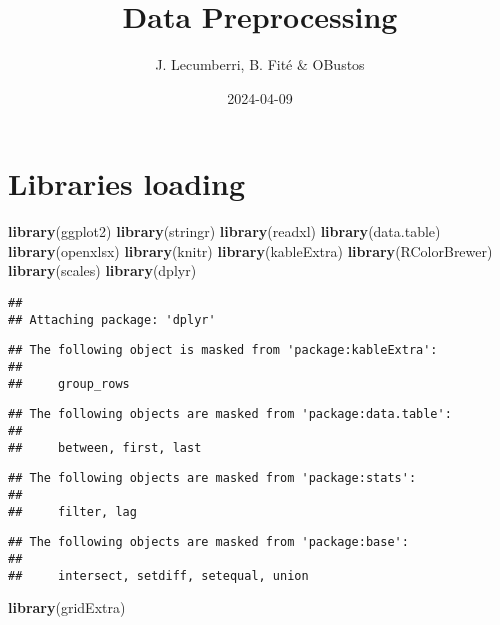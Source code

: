 \documentclass[
]{article}
\title{Data Preprocessing}
\author{J. Lecumberri, B. Fité \& OBustos}
\date{2024-04-09}
\newenvironment{Shaded}{\begin{snugshade}}{\end{snugshade}}
\newcommand{\FunctionTok}[1]{\textcolor[rgb]{0.13,0.29,0.53}{\textbf{#1}}}
\newcommand{\NormalTok}[1]{#1}
\begin{document}
\maketitle

{
\setcounter{tocdepth}{5}
\tableofcontents
}
\hypertarget{libraries-loading}{%
\section{Libraries loading}\label{libraries-loading}}

\begin{Shaded}
\begin{Highlighting}[]
\FunctionTok{library}\NormalTok{(ggplot2)}
\FunctionTok{library}\NormalTok{(stringr)}
\FunctionTok{library}\NormalTok{(readxl)}
\FunctionTok{library}\NormalTok{(data.table)}
\FunctionTok{library}\NormalTok{(openxlsx)}
\FunctionTok{library}\NormalTok{(knitr)}
\FunctionTok{library}\NormalTok{(kableExtra)}
\FunctionTok{library}\NormalTok{(RColorBrewer)}
\FunctionTok{library}\NormalTok{(scales)}
\FunctionTok{library}\NormalTok{(dplyr)}
\end{Highlighting}
\end{Shaded}

\begin{verbatim}
## 
## Attaching package: 'dplyr'
\end{verbatim}

\begin{verbatim}
## The following object is masked from 'package:kableExtra':
## 
##     group_rows
\end{verbatim}

\begin{verbatim}
## The following objects are masked from 'package:data.table':
## 
##     between, first, last
\end{verbatim}

\begin{verbatim}
## The following objects are masked from 'package:stats':
## 
##     filter, lag
\end{verbatim}

\begin{verbatim}
## The following objects are masked from 'package:base':
## 
##     intersect, setdiff, setequal, union
\end{verbatim}

\begin{Shaded}
\begin{Highlighting}[]
\FunctionTok{library}\NormalTok{(gridExtra)}
\end{Highlighting}
\end{Shaded}
\end{document}
